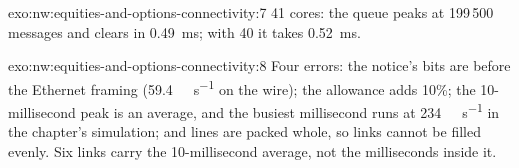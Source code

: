 \begin{solution}{exo:nw:equities-and-options-connectivity:7}
41 cores: the queue peaks at 199\,500 messages and clears in \qty{0.49}{\milli\second}; with 40 it takes \qty{0.52}{\milli\second}.
\end{solution}

\begin{solution}{exo:nw:equities-and-options-connectivity:8}
Four errors: the notice's bits are before the Ethernet framing (\qty{59.4}{\giga\bit\per\second} on the wire); the allowance adds 10\%;
the 10-millisecond peak is an average, and the busiest millisecond runs at \qty{234}{\giga\bit\per\second} in the chapter's simulation;
and lines are packed whole, so links cannot be filled evenly. Six links carry the 10-millisecond average, not the milliseconds inside it.
\end{solution}

